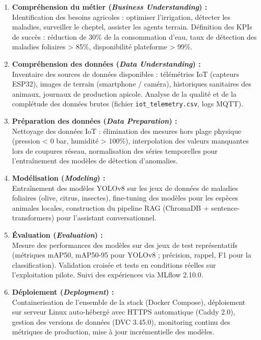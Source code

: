 \documentclass[12pt, a4paper]{report}
\begin{document}
\begin{enumerate}[leftmargin=*, label=\textcolor{primary}{\textbf{\arabic*.}}]
    \item \textbf{Compréhension du métier (\textit{Business Understanding}) :}\\
    Identification des besoins agricoles : optimiser l'irrigation, détecter les maladies, surveiller le cheptel, assister les agents terrain. Définition des KPIs de succès : réduction de 30\% de la consommation d'eau, taux de détection des maladies foliaires > 85\%, disponibilité plateforme > 99\%.

    \item \textbf{Compréhension des données (\textit{Data Understanding}) :}\\
    Inventaire des sources de données disponibles : télémétries IoT (capteurs ESP32), images de terrain (smartphone / caméra), historiques sanitaires des animaux, journaux de production apicole. Analyse de la qualité et de la complétude des données brutes (fichier \texttt{iot\_telemetry.csv}, logs MQTT).

    \item \textbf{Préparation des données (\textit{Data Preparation}) :}\\
    Nettoyage des données IoT : élimination des mesures hors plage physique (pression < 0 bar, humidité > 100\%), interpolation des valeurs manquantes lors de coupures réseau, normalisation des séries temporelles pour l'entraînement des modèles de détection d'anomalies.

    \item \textbf{Modélisation (\textit{Modeling}) :}\\
    Entraînement des modèles YOLOv8 sur les jeux de données de maladies foliaires (olive, citrus, insectes), fine-tuning des modèles pour les espèces animales locales, construction du pipeline RAG (ChromaDB + sentence-transformers) pour l'assistant conversationnel.

    \item \textbf{Évaluation (\textit{Evaluation}) :}\\
    Mesure des performances des modèles sur des jeux de test représentatifs (métriques mAP50, mAP50-95 pour YOLOv8 ; précision, rappel, F1 pour la classification). Validation croisée et tests en conditions réelles sur l'exploitation pilote. Suivi des expériences via MLflow 2.10.0.

    \item \textbf{Déploiement (\textit{Deployment}) :}\\
    Containerisation de l'ensemble de la stack (Docker Compose), déploiement sur serveur Linux auto-hébergé avec HTTPS automatique (Caddy 2.0), gestion des versions de données (DVC 3.45.0), monitoring continu des métriques de production, mise à jour incrémentielle des modèles.
\end{enumerate}
\end{document}
